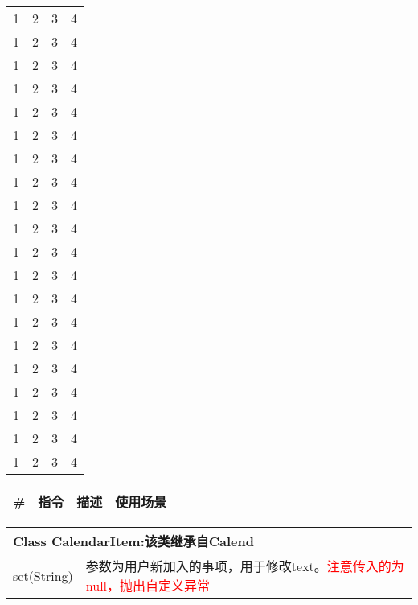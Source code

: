 \documentclass[UTF8,a4paper,12pt]{ctexart}%
\begin{document}
\begin{center}
\begin{longtable}{|c|c|c|c|}
		1 & 2 & 3 & 4 \\ 1 & 2 & 3 & 4 \\ 1 & 2 & 3 & 4 \\ 1 & 2 & 3 & 4 \\
		1 & 2 & 3 & 4 \\ 1 & 2 & 3 & 4 \\ 1 & 2 & 3 & 4 \\ 1 & 2 & 3 & 4 \\
		1 & 2 & 3 & 4 \\ 1 & 2 & 3 & 4 \\ 1 & 2 & 3 & 4 \\ 1 & 2 & 3 & 4 \\
		1 & 2 & 3 & 4 \\ 1 & 2 & 3 & 4 \\ 1 & 2 & 3 & 4 \\ 1 & 2 & 3 & 4 \\
		1 & 2 & 3 & 4 \\ 1 & 2 & 3 & 4 \\ 1 & 2 & 3 & 4 \\ 1 & 2 & 3 & 4 \\
	\end{longtable}
\end{center}

\begin{center}
	\begin{longtable}{|p{1cm}|p{2cm}|p{3cm}|p{4cm}|}
		\hline
		\#&指令&描述&使用场景\\ \hline \hline
		\endhead
	\end{longtable}
\end{center}

\begin{center}
	\begin{tabular}{|p{5cm}|p{6cm}|}
		\hline
		\multicolumn{2}{|p{11cm}|}{\textbf{Class  CalendarItem:}该类继承自Calend}\\ \hline
		set(String)& 参数为用户新加入的事项，用于修改text。\textcolor{red}{注意传入的为null，抛出自定义异常}\\ \hline
	\end{tabular}
\end{center}

\newpage
{}
\end{document}
